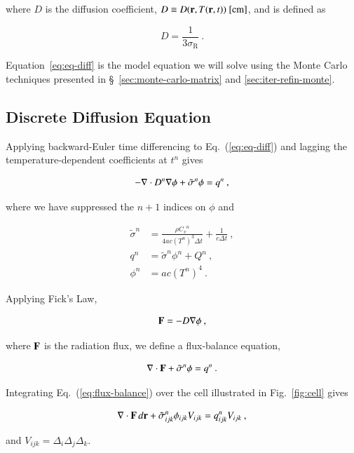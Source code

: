 \documentclass[preprint,12pt]{elsarticle}
\newcommand{\Cv}{\ensuremath{C_{v}}}
\newcommand{\ros}{\ensuremath{\sigma_{\scriptscriptstyle\mathrm{R}}}}
\newcommand{\dt}{\ensuremath{\Delta t}}
\newcommand{\sign}{\ensuremath{\tilde{\sigma}^n}}
\newcommand{\qn}{\ensuremath{q^n}} \newcommand{\Tn}{\ensuremath{T^n}}
\newcommand{\Dn}{\ensuremath{D^n}}
\newcommand{\phin}{\ensuremath{\phi^n}}
\begin{document}
where $D$ is the diffusion coefficient, $D\equiv
D(\mathbf{r},T(\mathbf{r},t))\ [\text{cm}]$, and is defined as

\begin{equation}
  D = \frac{1}{3\ros}\:.
\end{equation}

Equation~\eqref{eq:eq-diff} is the model equation we will solve using
the Monte Carlo techniques presented in
\S~\ref{sec:monte-carlo-matrix} and \ref{sec:iter-refin-monte}.

\subsection{Discrete Diffusion Equation}

Applying backward-Euler time differencing to Eq.~(\ref{eq:eq-diff})
and lagging the temperature-dependent coefficients at $t^n$ gives

\begin{equation}
  -\nabla\cdot \Dn\grad{\phi} + \sign\phi = \qn\:,
\end{equation}

where we have suppressed the $n+1$ indices on $\phi$ and

\begin{align}
  \sign &= \frac{\rho \Cv^n}{4ac(\Tn)^3\dt} + \frac{1}{c\dt}\:,\\ \qn
  &= \sign\phin + Q^n\:,\\ \phin &= ac(\Tn)^4\:.
\end{align}

Applying Fick's Law,

\begin{equation}
  \mathbf{F} = -D\nabla \phi\:,
  \label{eq:fick}
\end{equation}

where $\mathbf{F}$ is the radiation flux, we define a flux-balance
equation,

\begin{equation}
  \dive{F} + \sign\phi = \qn\:.
  \label{eq:flux-balance}
\end{equation}

Integrating Eq.~(\ref{eq:flux-balance}) over the cell illustrated in
Fig.~\ref{fig:cell} gives

\begin{equation}
  \iiint\dive{F}\,d\ve{r} +
  \sign_{ijk}\phi_{ijk}V_{ijk}=\qn_{ijk}V_{ijk}\:,
  \label{eq:flux-balance-vol-integral}
\end{equation}

and $V_{ijk} = \Delta_i\Delta_j\Delta_k$.
\end{document}
